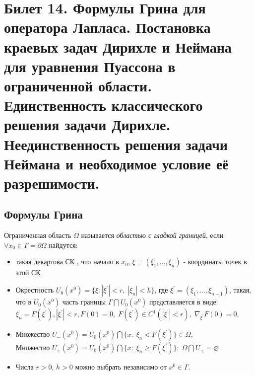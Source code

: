 \documentclass[../main.tex]{subfiles}
\begin{document}
\section{Билет 14. Формулы Грина для оператора Лапласа. Постановка краевых задач Дирихле и Неймана для уравнения Пуассона в ограниченной области. Единственность классического решения задачи Дирихле. Неединственность решения задачи Неймана и необходимое условие её разрешимости.}
\subsection{Формулы Грина}
\begin{definition}
Ограниченная область $\Omega$ называется \textit{областью с гладкой границей}, если $\forall x_0 \in \Gamma = \partial \Omega$ найдутся:
\begin{itemize}
\item такая декартова СК , что начало в $x_0$, $\xi = (\xi_1, \ldots, \xi_n)$ - координаты точек в этой СК
\item Окрестность $U_0(x^0) = \{\xi\colon |\xi^{'}| < r,\; |\xi_n| < h\}$, где $\xi^{'} = (\xi_1, \ldots, \xi_{n - 1})$, такая, что в $U_0(x^0)$ часть границы $\Gamma \bigcap U_0(x^0)$ представляется в виде: $\xi_n = F(\xi^{'}), |\xi^{'}| < r, F(0) = 0,\; F(\xi^{'}) \in C^1(|\xi^{'}| < r),\; \nabla_{\xi^{'}} F(0) = 0$, 
\item Множество $U_{-}(x^0) = U_0(x^0) \bigcap \{x\colon\; \xi_n < F(\xi^{'})\} \in \Omega$, \\
Множество $U_{+}(x^0) = U_0(x^0) \bigcap \{x\colon\; \xi_n \geq F(\xi^{'})\}\colon\; \Omega \bigcap U_{+} = \varnothing$
\item Числа $r > 0$, $h > 0$ можно выбрать независимо от $x^0 \in \Gamma$.
\end{itemize}
\end{definition}
\end{document}
